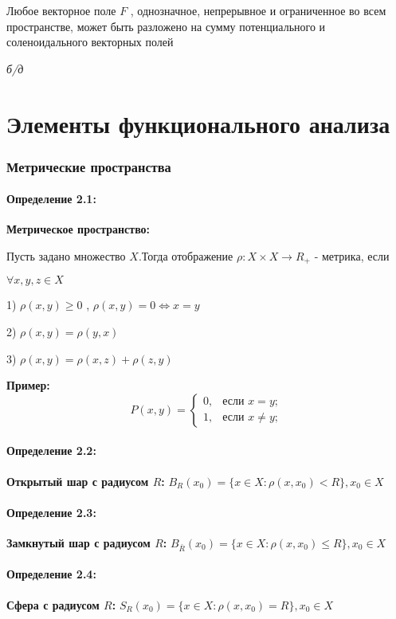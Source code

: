 \documentclass[12pt, english]{article}
\begin{document}
		Любое векторное поле $F$ , однозначное, непрерывное и ограниченное во всем пространстве, может быть разложено на сумму потенциального и соленоидального векторных полей	
	
	\textit{б/д}
	
	
\part{Элементы функционального анализа}
\section{Метрические пространства}
\subsection*{Определение 2.1:}
	\textbf{Метрическое пространство:}
	
	Пусть задано множество $X$.Тогда отображение $\rho: X \times X \to R_+$ - метрика, если 
	
	$\forall x,y,z \in X$
	
	1) $\rho(x,y) \ge 0$ , $\rho(x,y) = 0 \Leftrightarrow x = y$
	
	2) $\rho(x,y) = \rho(y,x)$
	
	3) $\rho(x,y) = \rho(x,z) + \rho(z,y) $
	
\textbf{Пример:}
	$$
P(x,y) = \begin{cases}
   0, &\text{если } x = y; \\
   1, &\text{если } x \neq y;
\end{cases}
$$	
	
\subsection*{Определение 2.2:}
	\textbf{Открытый шар с радиусом $R$:}
	$B_R(x_0) = \{{x \in X : \rho(x,x_0) < R}\} , x_0 \in X$
	
\subsection*{Определение 2.3:}
	\textbf{Замкнутый шар с радиусом $R$:}
	$B_{\bar{R}}(x_0) = \{{x \in X : \rho(x,x_0) \leq R}\} , x_0 \in X$

\subsection*{Определение 2.4:}
	\textbf{Сфера с радиусом $R$:}
	$S_R(x_0) = \{{x \in X : \rho(x,x_0) = R}\} , x_0 \in X$
\end{document}
